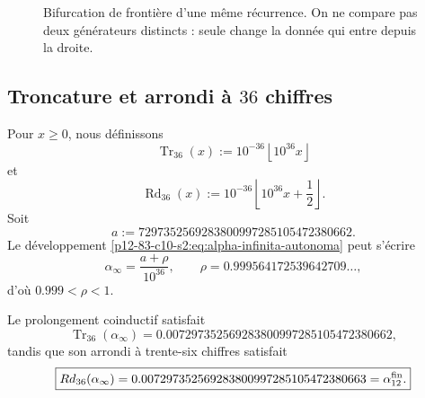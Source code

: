 \begin{figure}[htbp]
\centering
{}
\caption{Bifurcation de frontière d’une même récurrence. On ne compare pas
deux générateurs distincts : seule change la donnée qui entre depuis la
droite.}
\label{p12-83-c10-s2:fig:bifurcacion-frontera-alpha}
\end{figure}

\subsection{Troncature et arrondi à \(36\) chiffres}

Pour \(x\geq0\), nous définissons
\[
 \operatorname{Tr}_{36}(x)
 :=10^{-36}\left\lfloor10^{36}x\right\rfloor
\]
et
\[
 \operatorname{Rd}_{36}(x)
 :=10^{-36}\left\lfloor10^{36}x+\frac12\right\rfloor.
\]
Soit
\[
 a:=7297352569283800997285105472380662.
\]
Le développement \eqref{p12-83-c10-s2:eq:alpha-infinita-autonoma} peut s’écrire
\[
 \alpha_\infty=\frac{a+\rho}{10^{36}},
 \qquad
 \rho=0.999564172539642709\ldots,
\]
d’où \(0.999<\rho<1\).

\begin{theorem}
\label{p12-83-c10-s2:thm:frontera-alpha-662-663}
Le prolongement coinductif satisfait
\[
 \boxed{
 \operatorname{Tr}_{36}(\alpha_\infty)
 =0.007297352569283800997285105472380662,}
\]
tandis que son arrondi à trente-six chiffres satisfait
\[
 \boxed{
 \operatorname{Rd}_{36}(\alpha_\infty)
 =0.007297352569283800997285105472380663
 =\alpha_{12}^{\rm fin}.}
\]
\end{theorem}

